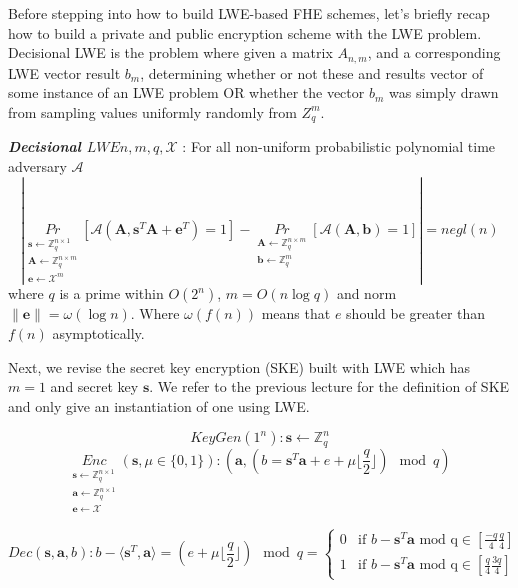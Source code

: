 \documentclass[usletter]{article}
\begin{document}
Before stepping into how to build LWE-based FHE schemes, let's briefly recap how to build a private and public encryption scheme\cite{goldwasser1996lecture} with the LWE problem.
Decisional LWE is the problem where given a matrix $A_{n,m}$, and a corresponding LWE vector result $b_m$, determining whether or not these 
and results vector of some instance of an LWE problem OR whether the vector $b_m$ was simply 
drawn from sampling values uniformly randomly from $Z^{m}_{q}$. 
\begin{definition}
\textbf{\textit{Decisional $LWE{n,m,q,\mathcal{X}}$}} : For all non-uniform probabilistic polynomial time adversary $\mathcal{A}$
$$|\underset{\substack{
\pmb{s}\leftarrow \mathbb{Z}_q^{n\times1}\\
\pmb{A}\leftarrow\mathbb{Z}_q^{n\times m}\\
\pmb{e}\leftarrow \mathcal{X}^m}}{Pr}
[\mathcal{A}(\pmb{A},\pmb{s}^T\pmb{A}+\pmb{e}^T)=1]
-\underset{\substack{\pmb{A}\leftarrow\mathbb{Z}_q^{n\times m}\\
\pmb{b}\leftarrow\mathbb{Z}_q^m}}{Pr} 
[\mathcal{A}(\pmb{A},\pmb{b})=1]|=negl(n)$$
where $q$ is a prime within $O(2^n)$, $m=O(n\log q)$\cite{regev2010learning} and norm $\parallel \pmb{e}\parallel=\omega(\log n)$. Where $\omega(f(n))$ means that 
$e$ should be greater than $f(n)$ asymptotically.
\end{definition}


Next, we revise the secret key encryption (SKE) built with LWE which has $m=1$ and secret key $\pmb{s}$. We refer to the previous lecture for the definition of SKE and only give an instantiation of one using LWE.

$$KeyGen(1^n): \pmb{s}\leftarrow\mathbb{Z}_q^n$$
$$\underset{\substack{
\pmb{s}\leftarrow \mathbb{Z}_q^{n\times1}\\
\pmb{a}\leftarrow\mathbb{Z}_q^{n\times 1}\\
\pmb{e}\leftarrow \mathcal{X}}}{Enc}(\pmb{s},\mu\in\{0,1\}): (\pmb{a}, (b = \pmb{s}^T\pmb{a}+e+\mu\lfloor\frac{q}{2}\rfloor)\mod q)$$


$$Dec(\pmb{s},\pmb{a},b): b-\langle\pmb{s}^T,\pmb{a}\rangle=(e+\mu\lfloor\frac{q}{2}\rfloor) \mod q =   
  \begin{cases}
    0 & \text{if $b - \pmb{s}^T\pmb{a}$ mod q}  \in [\frac{-q}{4} \frac{q}{4} ] \\%
    1 & \text{if $b - \pmb{s}^T\pmb{a}$ mod q}  \in [\frac{q}{4} \frac{3q}{4} ]%
  \end{cases}$$
  
\end{document}
